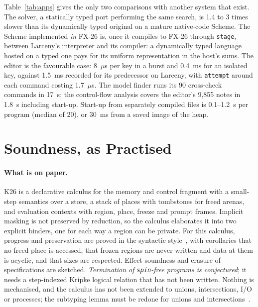 \documentclass[acmsmall,screen,review]{acmart}
\newcommand{\cd}[1]{\texttt{#1}}
\newcommand{\fx}{FX-26}
\begin{document}
Table~\ref{tab:apps} gives the only two comparisons with another system that exist. The solver,
a statically typed port performing the same search, is 1.4 to 3 times
slower than its dynamically typed original on a mature native-code
Scheme. The Scheme implemented \emph{in} \fx{} is, once it compiles to
\fx{} through \cd{stage}, between Larceny's interpreter and its
compiler: a dynamically typed language hosted on a typed one pays for
its uniform representation in the host's sums. The editor is the
favourable case: 8~$\mu$s per key in a burst and 0.4~ms for an
isolated key, against 1.5~ms recorded for its predecessor on Larceny,
with \cd{attempt} around each command costing 1.7~$\mu$s. The model
finder runs its 90 cross-check commands in 17~s; the control-flow
analysis covers the editor's 9,855 notes in 1.8~s including start-up.
Start-up from separately compiled files is 0.1--1.2~s per program (median of 20), or 30~ms from a saved image of the heap.

\section{Soundness, as Practised}
\label{sec:soundness}

\paragraph{What is on paper.} K26 is a declarative calculus for the
memory and control fragment with a small-step semantics over a store,
a stack of places with tombstones for freed arenas, and evaluation
contexts with region, place, freeze and prompt frames. Implicit
masking is not preserved by reduction, so the calculus elaborates it
into two explicit binders, one for each way a region can be private.
For this calculus, progress and preservation are proved in the
syntactic style~\cite{wright-felleisen}, with corollaries that no freed
place is accessed, that frozen regions are never written and data at
them is acyclic, and that sizes are respected. Effect soundness and
erasure of specifications are sketched. \emph{Termination of
\cd{spin}-free programs is conjectured}; it needs a step-indexed Kripke
logical relation that has not been written. Nothing is mechanised, and
the calculus has not been extended to unions, intersections, I/O or
processes; the subtyping lemma must be redone for unions and
intersections~\cite{muehlboeck-tate}.
\end{document}
